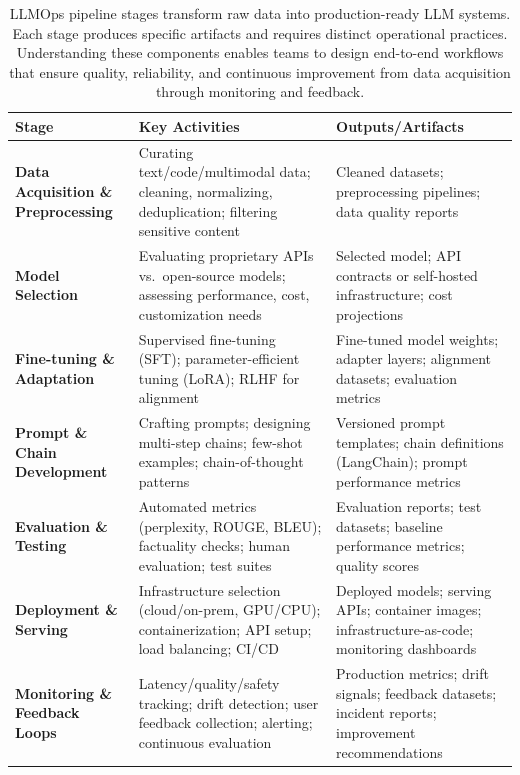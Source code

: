 \begin{table}[t]
\centering
\small
\caption{LLMOps pipeline stages transform raw data into production-ready LLM systems. Each stage produces specific artifacts and requires distinct operational practices. Understanding these components enables teams to design end-to-end workflows that ensure quality, reliability, and continuous improvement from data acquisition through monitoring and feedback.}
\label{tab:ch02_pipeline_components}
\setlength{\tabcolsep}{6pt}
\renewcommand{\arraystretch}{1.3}
\begin{tabularx}{\linewidth}{@{}>{\raggedright\arraybackslash}p{3.5cm}>{\raggedright\arraybackslash}X>{\raggedright\arraybackslash}X@{}}
\toprule
\rowcolor{gray!15}
\textbf{Stage} & \textbf{Key Activities} & \textbf{Outputs/Artifacts} \\
\midrule
\textbf{Data Acquisition \& Preprocessing} & Curating text/code/multimodal data; cleaning, normalizing, deduplication; filtering sensitive content & Cleaned datasets; preprocessing pipelines; data quality reports \\
\addlinespace[2pt]
\textbf{Model Selection} & Evaluating proprietary APIs vs.\ open-source models; assessing performance, cost, customization needs & Selected model; API contracts or self-hosted infrastructure; cost projections \\
\addlinespace[2pt]
\textbf{Fine-tuning \& Adaptation} & Supervised fine-tuning (SFT); parameter-efficient tuning (LoRA); RLHF for alignment & Fine-tuned model weights; adapter layers; alignment datasets; evaluation metrics \\
\addlinespace[2pt]
\textbf{Prompt \& Chain Development} & Crafting prompts; designing multi-step chains; few-shot examples; chain-of-thought patterns & Versioned prompt templates; chain definitions (LangChain); prompt performance metrics \\
\addlinespace[2pt]
\textbf{Evaluation \& Testing} & Automated metrics (perplexity, ROUGE, BLEU); factuality checks; human evaluation; test suites & Evaluation reports; test datasets; baseline performance metrics; quality scores \\
\addlinespace[2pt]
\textbf{Deployment \& Serving} & Infrastructure selection (cloud/on-prem, GPU/CPU); containerization; API setup; load balancing; CI/CD & Deployed models; serving APIs; container images; infrastructure-as-code; monitoring dashboards \\
\addlinespace[2pt]
\textbf{Monitoring \& Feedback Loops} & Latency/quality/safety tracking; drift detection; user feedback collection; alerting; continuous evaluation & Production metrics; drift signals; feedback datasets; incident reports; improvement recommendations \\
\bottomrule
\end{tabularx}
\end{table}

